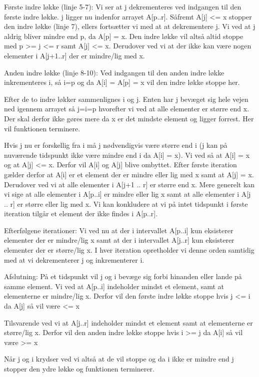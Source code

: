 Første indre løkke (linje 5-7):
Vi ser at j dekrementeres ved indgangen til den første indre løkke. j ligger nu indenfor arrayet A[p..r]. 
Såfremt A[j] <= x stopper den indre løkke (linje 7), ellers fortsætter vi med at at dekrementere j.
Vi ved at j aldrig bliver mindre end p, da A[p] = x. Den indre løkke vil altså altid stoppe med p >= j <= r samt A[j] <= x.
Derudover ved vi at der ikke kan være nogen elementer i A[j+1..r] der er mindre/lig med x.
 
Anden indre løkke (linje 8-10):
Ved indgangen til den anden indre løkke inkrementeres i, så i=p og da A[i] = A[p] = x vil den indre løkke stoppe her.

Efter de to indre løkker sammenlignes i og j.
Enten har j bevæget sig hele vejen ned igennem arrayet så j=i=p hvorefter vi ved at alle elementer er større end x. Der skal derfor ikke gøres mere da x er det mindste element og ligger forrest. Her vil funktionen terminere.

Hvis j nu er forskellig fra i må j nødvendigvis være større end i (j kan på nuværende tidspunkt ikke være mindre end i da A[i] = x).
Vi ved så at A[i] = x og at A[j] <= x. Derfor vil A[i] og A[j] blive ombyttet.
Efter første iteration gælder derfor at A[i] er et element der er mindre eller lig med x samt at A[j] = x. Derudover ved vi at alle elementer i A[j+1 .. r] er større end x.
Mere generelt kan vi sige at alle elementer i A[p..i] er mindre eller lig x samt at alle elementer i A[j .. r] er større eller lig med x.
Vi kan konkludere at vi på intet tidspunkt i første iteration tilgår et element der ikke findes i A[p..r].

Efterfølgene iterationer:
Vi ved nu at der i intervallet A[p..i] kun eksisterer elementer der er mindre/lig x samt at der i intervallet A[j..r] kun eksisterer elementer der er større/lig x. I hver iteration opretholder vi denne orden samtidig med at vi dekrementerer j og inkrementerer i.


Afslutning:
På et tidspunkt vil j og i bevæge sig forbi hinanden eller lande på samme element. 
Vi ved at A[p..i] indeholder mindst et element, samt at elementerne er mindre/lig x. Derfor vil den første indre løkke stoppe hvis j <= i da A[j] så vil være <= x

Tilsvarende ved vi at A[j..r] indeholder mindst et element samt at elementerne er større/lig x. Derfor vil den anden indre løkke stoppe hvis i >= j da A[i] så vil være >= x

Når j og i krydser ved vi altså at de vil stoppe og da i ikke er mindre end j stopper den ydre løkke og funktionen terminerer. 


